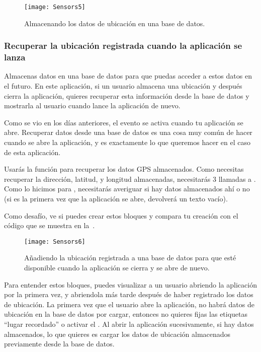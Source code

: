 \begin{figure}[H]
\vspace{3em}
\centering
\texttt{[image: Sensors5]}
\caption{Almacenando los datos de ubicación en una base de datos.}
\label{fig:Sensors5}
\end{figure}

\subsubsection*{Recuperar la ubicación registrada cuando la aplicación se lanza}

Almacenas datos en una base de datos para que puedas acceder a estos
datos en el futuro. En este aplicación, si un usuario almacena una
ubicación y después cierra la aplicación, quieres recuperar esta
información desde la base de datos y mostrarla al usuario cuando
lance la aplicación de nuevo.

Como se vio en los días anteriores, el evento
 se activa cuando tu aplicación se
abre. Recuperar datos desde una base de datos es una cosa muy común de
hacer cuando se abre la aplicación, y es exactamente lo que queremos
hacer en el caso de esta aplicación.

Usarás la función  para recuperar los datos
GPS almacenados. Como necesitas recuperar la dirección, latitud, y
longitud almacenadas, necesitarás 3 llamadas a . Como
lo hicimos para , necesitarás averiguar si
hay datos almacenados ahí o no (si es la primera vez que la aplicación
se abre,  devolverá un texto vacío).

Como desafío, ve si puedes crear estos bloques y compara tu creación
con el código que se muestra en la~.

\begin{figure}[H]
\vspace{3em}
\centering
\texttt{[image: Sensors6]}
\caption{Añadiendo la ubicación registrada a una base de datos para
  que esté disponible cuando la aplicación se cierra y se abre de
  nuevo.}
\label{fig:Sensors6}
\end{figure}

Para entender estos bloques, puedes visualizar a un usuario abriendo
la aplicación por la primera vez, y abriendola más tarde después de
haber registrado los datos de ubicación. La primera vez que el usuario
abre la aplicación, no habrá datos de ubicación en la base de datos
por cargar, entonces no quieres fijas las etiquetas ``lugar
recordado'' o activar el . Al
abrir la aplicación sucesivamente, si hay datos almacenados, lo que
quieres es cargar los datos de ubicación almacenados previamente desde
la base de datos.

